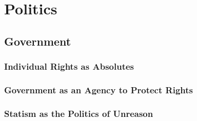 \part{Politics}

\chapter{Government}

    \section{Individual Rights as Absolutes}

    \section{Government as an Agency to Protect Rights}

    \section{Statism as the Politics of Unreason}